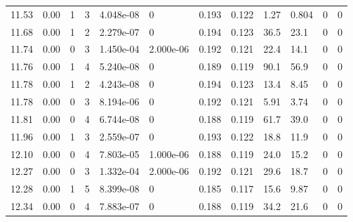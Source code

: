 \documentclass[preview]{standalone}
\begin{document}
{{{\begin{tabular}{L{1.2cm}C{1.2cm} C{0.3cm}C{0.5cm} C{1.4cm}C{1.4cm} C{1.4cm}C{1.4cm} C{1.6cm}C{1.6cm} C{1.6cm}C{1.6cm}}
  11.53  &  0.00  & 1     &  3 &  4.048e-08  & 0  &  0.193&   0.122& 1.27 & 0.804   &  0 & 0  \\ 
  11.68  &  0.00  & 1     &  2 &  2.279e-07  & 0  &  0.194&   0.123& 36.5 & 23.1   &  0 & 0  \\ 
  11.74  &  0.00  & 0     &  3 &  1.450e-04  & 2.000e-06  &  0.192&   0.121& 22.4 & 14.1   &  0 & 0  \\ 
  11.76  &  0.00  & 1     &  4 &  5.240e-08  & 0  &  0.189&   0.119& 90.1 & 56.9   &  0 & 0  \\ 
  11.78  &  0.00  & 1     &  2 &  4.243e-08  & 0  &  0.194&   0.123& 13.4 & 8.45   &  0 & 0  \\ 
  11.78  &  0.00  & 0     &  3 &  8.194e-06  & 0  &  0.192&   0.121& 5.91 & 3.74   &  0 & 0  \\ 
  11.81  &  0.00  & 0     &  4 &  6.744e-08  & 0  &  0.188&   0.119& 61.7 & 39.0   &  0 & 0  \\ 
  11.96  &  0.00  & 1     &  3 &  2.559e-07  & 0  &  0.193&   0.122& 18.8 & 11.9   &  0 & 0  \\ 
  12.10  &  0.00  & 0     &  4 &  7.803e-05  & 1.000e-06  &  0.188&   0.119& 24.0 & 15.2   &  0 & 0  \\ 
  12.27  &  0.00  & 0     &  3 &  1.332e-04  & 2.000e-06  &  0.192&   0.121& 29.6 & 18.7   &  0 & 0  \\ 
  12.28  &  0.00  & 1     &  5 &  8.399e-08  & 0  &  0.185&   0.117& 15.6 & 9.87   &  0 & 0  \\ 
  12.34  &  0.00  & 0     &  4 &  7.883e-07  & 0  &  0.188&   0.119& 34.2 & 21.6   &  0 & 0  \\ 
\hline 
\end{tabular} 

}}}
\end{document}
